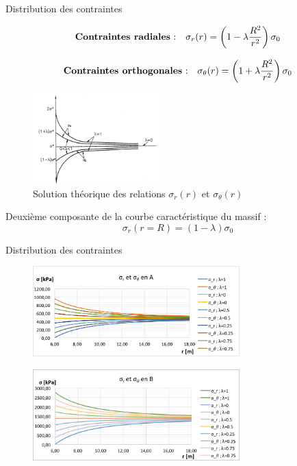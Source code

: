 \documentclass{beamer}
\begin{document}
\begin{frame}{Distribution des contraintes}
    
     \[\text{\textbf{Contraintes radiales} :}\quad \sigma_r(r) = \left( 1 - \lambda \dfrac{R^2}{r^2}\right) \sigma_0\]
        
    \[\text{\textbf{Contraintes orthogonales} :}\quad \sigma_{\theta}(r) = \left( 1 + \lambda \dfrac{R^2}{r^2}\right) \sigma_0\]
    
    \begin{figure}
    \centering
    \includegraphics[height=3.5cm]{Results_sigmar.png}
    \caption{\scriptsize{Solution théorique des relations $\sigma_r(r)$ et $\sigma_{\theta}(r)$}}
    \label{Results_sigmar}
    \end{figure}
    
    Deuxième composante de la courbe caractéristique du massif : \[\sigma_r(r=R) = (1-\lambda)\sigma_0\]

\end{frame}




\begin{frame}{Distribution des contraintes}

\begin{figure}
\centering
\includegraphics[width=8cm]{sig_A.png}
\end{figure}

\begin{figure}
\centering
\includegraphics[width=8cm]{sig_B.png}
\end{figure}
    
\end{frame}
\end{document}
